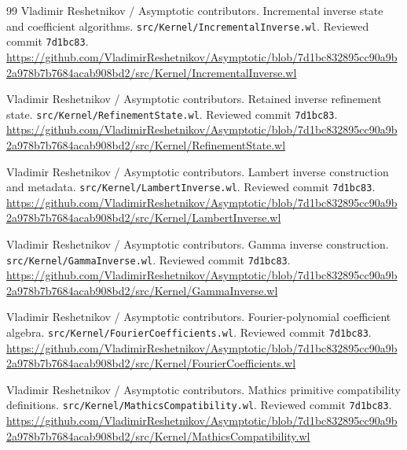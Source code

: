 \documentclass[11pt,letterpaper]{article}
\newcommand{\code}[1]{\nolinkurl{#1}}
\begin{document}
\begin{thebibliography}{99}
 Vladimir Reshetnikov / Asymptotic contributors. Incremental inverse state and coefficient algorithms.\newline
\code{src/Kernel/IncrementalInverse.wl}. Reviewed commit \code{7d1bc83}.\newline
\url{https://github.com/VladimirReshetnikov/Asymptotic/blob/7d1bc832895cc90a9b2a978b7b7684acab908bd2/src/Kernel/IncrementalInverse.wl}

 Vladimir Reshetnikov / Asymptotic contributors. Retained inverse refinement state.\newline
\code{src/Kernel/RefinementState.wl}. Reviewed commit \code{7d1bc83}.\newline
\url{https://github.com/VladimirReshetnikov/Asymptotic/blob/7d1bc832895cc90a9b2a978b7b7684acab908bd2/src/Kernel/RefinementState.wl}

 Vladimir Reshetnikov / Asymptotic contributors. Lambert inverse construction and metadata.\newline
\code{src/Kernel/LambertInverse.wl}. Reviewed commit \code{7d1bc83}.\newline
\url{https://github.com/VladimirReshetnikov/Asymptotic/blob/7d1bc832895cc90a9b2a978b7b7684acab908bd2/src/Kernel/LambertInverse.wl}

 Vladimir Reshetnikov / Asymptotic contributors. Gamma inverse construction.\newline
\code{src/Kernel/GammaInverse.wl}. Reviewed commit \code{7d1bc83}.\newline
\url{https://github.com/VladimirReshetnikov/Asymptotic/blob/7d1bc832895cc90a9b2a978b7b7684acab908bd2/src/Kernel/GammaInverse.wl}

 Vladimir Reshetnikov / Asymptotic contributors. Fourier-polynomial coefficient algebra.\newline
\code{src/Kernel/FourierCoefficients.wl}. Reviewed commit \code{7d1bc83}.\newline
\url{https://github.com/VladimirReshetnikov/Asymptotic/blob/7d1bc832895cc90a9b2a978b7b7684acab908bd2/src/Kernel/FourierCoefficients.wl}

 Vladimir Reshetnikov / Asymptotic contributors. Mathics primitive compatibility definitions.\newline
\code{src/Kernel/MathicsCompatibility.wl}. Reviewed commit \code{7d1bc83}.\newline
\url{https://github.com/VladimirReshetnikov/Asymptotic/blob/7d1bc832895cc90a9b2a978b7b7684acab908bd2/src/Kernel/MathicsCompatibility.wl}


\end{thebibliography}
\end{document}
